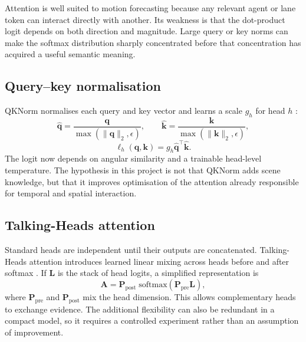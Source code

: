 Attention is well suited to motion forecasting because any relevant agent or lane token can interact directly with another. Its weakness is that the dot-product logit depends on both direction and magnitude. Large query or key norms can make the softmax distribution sharply concentrated before that concentration has acquired a useful semantic meaning.

\subsection{Query--key normalisation}

QKNorm normalises each query and key vector and learns a scale $g_h$ for head $h$ \cite{henry2020qknorm}:
\begin{equation}
    \hat{\mathbf{q}} = \frac{\mathbf{q}}{\max(\lVert\mathbf{q}\rVert_2,\epsilon)},
    \qquad
    \hat{\mathbf{k}} = \frac{\mathbf{k}}{\max(\lVert\mathbf{k}\rVert_2,\epsilon)},
\end{equation}
\begin{equation}
    \ell_h(\mathbf{q},\mathbf{k}) = g_h\hat{\mathbf{q}}^{\top}\hat{\mathbf{k}}.
    \label{eq:qknorm}
\end{equation}
The logit now depends on angular similarity and a trainable head-level temperature. The hypothesis in this project is not that QKNorm adds scene knowledge, but that it improves optimisation of the attention already responsible for temporal and spatial interaction.

\subsection{Talking-Heads attention}

Standard heads are independent until their outputs are concatenated. Talking-Heads attention introduces learned linear mixing across heads before and after softmax \cite{shazeer2020talkingheads}. If $\mathbf{L}$ is the stack of head logits, a simplified representation is
\begin{equation}
    \mathbf{A} = \mathbf{P}_{\mathrm{post}}
    \;\mathrm{softmax}\left(\mathbf{P}_{\mathrm{pre}}\mathbf{L}\right),
\end{equation}
where $\mathbf{P}_{\mathrm{pre}}$ and $\mathbf{P}_{\mathrm{post}}$ mix the head dimension. This allows complementary heads to exchange evidence. The additional flexibility can also be redundant in a compact model, so it requires a controlled experiment rather than an assumption of improvement.

